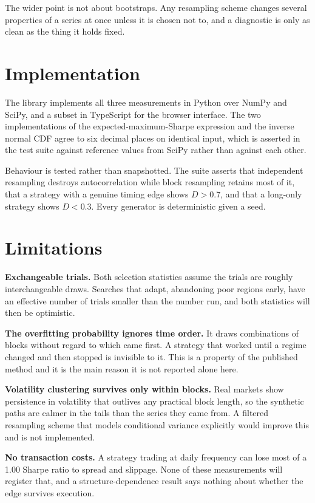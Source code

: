 \documentclass[11pt]{article}
\begin{document}
The wider point is not about bootstraps. Any resampling scheme changes several
properties of a series at once unless it is chosen not to, and a diagnostic is
only as clean as the thing it holds fixed.

\section{Implementation}

The library implements all three measurements in Python over NumPy and SciPy, and a subset in TypeScript for the browser interface. The two implementations of the expected-maximum-Sharpe expression and the inverse normal CDF agree to six decimal places on identical input, which is asserted in the test suite against reference values from SciPy rather than against each other.

Behaviour is tested rather than snapshotted. The suite asserts that independent resampling destroys autocorrelation while block resampling retains most of it, that a strategy with a genuine timing edge shows $D > 0.7$, and that a long-only strategy shows $D < 0.3$. Every generator is deterministic given a seed.

\section{Limitations}

\textbf{Exchangeable trials.} Both selection statistics assume the trials are roughly interchangeable draws. Searches that adapt, abandoning poor regions early, have an effective number of trials smaller than the number run, and both statistics will then be optimistic.

\textbf{The overfitting probability ignores time order.} It draws combinations of blocks without regard to which came first. A strategy that worked until a regime changed and then stopped is invisible to it. This is a property of the published method and it is the main reason it is not reported alone here.

\textbf{Volatility clustering survives only within blocks.} Real markets show persistence in volatility that outlives any practical block length, so the synthetic paths are calmer in the tails than the series they came from. A filtered resampling scheme that models conditional variance explicitly would improve this and is not implemented.

\textbf{No transaction costs.} A strategy trading at daily frequency can lose most of a 1.00 Sharpe ratio to spread and slippage. None of these measurements will register that, and a structure-dependence result says nothing about whether the edge survives execution.
\end{document}
